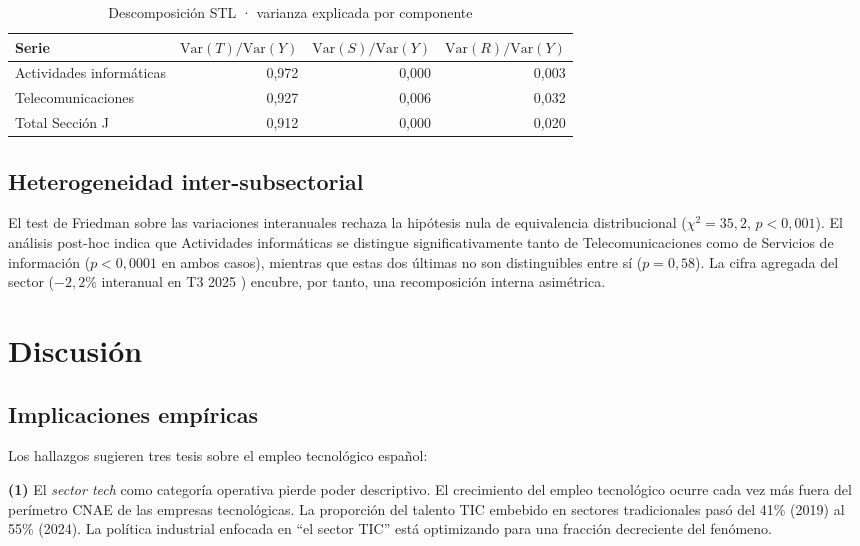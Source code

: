 \documentclass[11pt,a4paper]{article}
\begin{document}
\begin{table}[h]
\centering
\caption{Descomposición STL · varianza explicada por componente}
\label{tab:stl}
\begin{tabular}{lrrr}
\toprule
\textbf{Serie} & $\text{Var}(T)/\text{Var}(Y)$ & $\text{Var}(S)/\text{Var}(Y)$ & $\text{Var}(R)/\text{Var}(Y)$ \\
\midrule
Actividades informáticas & 0,972 & 0,000 & 0,003 \\
Telecomunicaciones       & 0,927 & 0,006 & 0,032 \\
Total Sección J          & 0,912 & 0,000 & 0,020 \\
\bottomrule
\end{tabular}
\end{table}

\subsection{Heterogeneidad inter-subsectorial}

El test de Friedman sobre las variaciones interanuales rechaza la hipótesis nula
de equivalencia distribucional ($\chi^2 = 35{,}2$, $p < 0{,}001$). El análisis
post-hoc indica que Actividades informáticas se distingue significativamente
tanto de Telecomunicaciones como de Servicios de información ($p < 0{,}0001$ en
ambos casos), mientras que estas dos últimas no son distinguibles entre sí
($p = 0{,}58$). La cifra agregada del sector ($-2{,}2\%$ interanual en T3 2025
\citep{randstad2026}) encubre, por tanto, una recomposición interna asimétrica.

\section{Discusión}

\subsection{Implicaciones empíricas}

Los hallazgos sugieren tres tesis sobre el empleo tecnológico español:

\textbf{(1)} El \emph{sector tech} como categoría operativa pierde poder
descriptivo. El crecimiento del empleo tecnológico ocurre cada vez más fuera
del perímetro CNAE de las empresas tecnológicas. La proporción del talento TIC
embebido en sectores tradicionales pasó del 41\% (2019) al 55\% (2024). La
política industrial enfocada en ``el sector TIC'' está optimizando para una
fracción decreciente del fenómeno.
\end{document}
